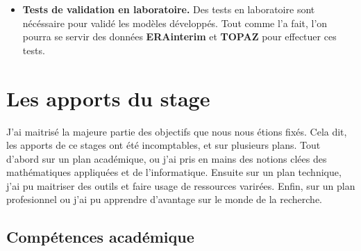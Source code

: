 \begin{itemize}
    \item \textbf{Tests de validation en laboratoire.} Des tests en laboratoire sont nécéssaire pour validé les modèles développés. Tout comme \citeauthor{rabatel2015thesis} l'a fait, l'on pourra se servir des données \textbf{ERAinterim} et \textbf{TOPAZ} pour effectuer ces tests.
\end{itemize}










\section{Les apports du stage}


J'ai maitrisé la majeure partie des objectifs que nous nous étions fixés. Cela dit, les apports de ce stages ont été incomptables, et sur plusieurs plans. Tout d'abord sur un plan académique, ou j'ai pris en mains des notions clées des mathématiques appliquées et de l'informatique. Ensuite sur un plan technique, j'ai pu maitriser des outils et faire usage de ressources varirées. Enfin, sur un plan profesionnel ou j'ai pu apprendre d'avantage sur le monde de la recherche.



\subsection{Compétences académique}

